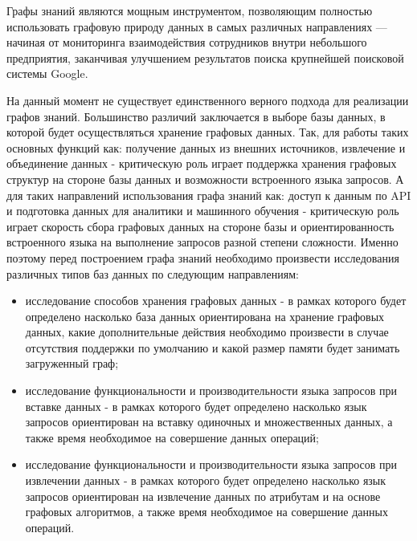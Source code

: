 Графы знаний являются мощным инструментом, позволяющим полностью использовать графовую природу данных в самых различных направлениях —
начиная от мониторинга взаимодействия сотрудников внутри небольшого предприятия, заканчивая улучшением результатов поиска крупнейшей
поисковой системы Google.

На данный момент не существует единственного верного подхода для реализации графов знаний. Большинство различий заключается в выборе базы
данных, в которой будет осуществляться хранение графовых данных. Так, для работы таких основных функций как: получение данных из внешних
источников, извлечение и объединение данных - критическую роль играет поддержка хранения графовых структур на стороне базы данных и
возможности встроенного языка запросов. А для таких направлений использования графа знаний как: доступ к данным по API и подготовка данных
для аналитики и машинного обучения - критическую роль играет скорость сбора графовых данных на стороне базы и ориентированность встроенного
языка на выполнение запросов разной степени сложности. Именно поэтому перед построением графа знаний необходимо произвести исследования
различных типов баз данных по следующим направлениям:

\begin{itemize}
    \item исследование способов хранения графовых данных - в рамках которого будет определено насколько база данных ориентирована на хранение графовых данных, какие дополнительные действия необходимо произвести в случае отсутствия поддержки по умолчанию и какой размер памяти будет занимать загруженный граф;
    \item исследование функциональности и производительности языка запросов при вставке данных - в рамках которого будет определено насколько язык запросов ориентирован на вставку одиночных и множественных данных, а также время необходимое на совершение данных операций;
    \item исследование функциональности и производительности языка запросов при извлечении данных - в рамках которого будет определено насколько язык запросов ориентирован на извлечение данных по атрибутам и на основе графовых алгоритмов, а также время необходимое на совершение данных операций.
\end{itemize}


